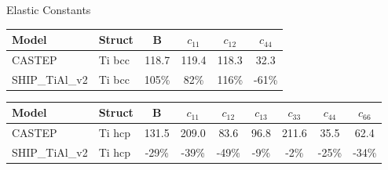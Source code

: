 \documentclass[preview]{standalone}
\begin{document}
\begin{center}
\textnormal{Elastic Constants} \\
\vspace{2mm}
\begin{tabular}{ l l c c c c } \toprule 
Model & Struct & B & $c_{11}$ & $c_{12}$ & $c_{44}$\\ \midrule 
CASTEP & Ti bcc & 118.7 & 119.4 & 118.3 & 32.3\\ 
SHIP\_TiAl\_v2 & Ti bcc & 105\% & 82\% & 116\% & -61\%\\ 
\end{tabular} \bigskip \begin{tabular}{ l l c c c c c c c } \toprule 
Model & Struct & B & $c_{11}$ & $c_{12}$ & $c_{13}$ & $c_{33}$ & $c_{44}$ & $c_{66}$\\ \midrule 
CASTEP & Ti hcp & 131.5 & 209.0 & 83.6 & 96.8 & 211.6 & 35.5 & 62.4\\ 
SHIP\_TiAl\_v2 & Ti hcp & -29\% & -39\% & -49\% & -9\% & -2\% & -25\% & -34\%\\ 
\end{tabular} \bigskip 
\end{center}
\end{document}
